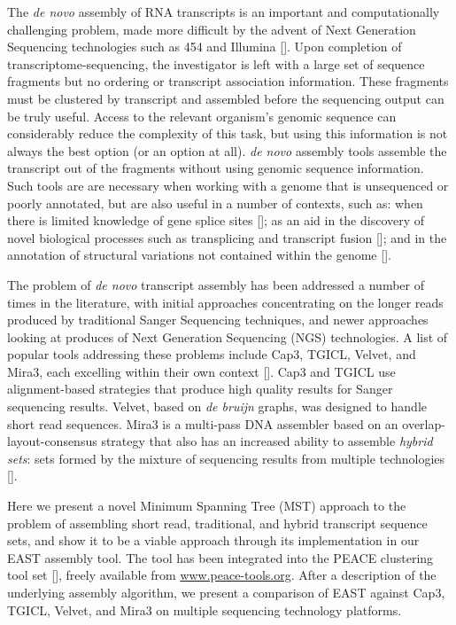 \documentclass{bioinfo}
\newcommand{\peace} {{\small PEACE}}
\newcommand{\capthree} {{\small Cap3}}
\newcommand{\tgicl} {{\small TGICL}}
\newcommand{\east} {{\small EAST}}
\newcommand{\velvet}{{\small Velvet}}
\newcommand{\mira}{{\small Mira3}}
\begin{document}
The {\it de novo} assembly of RNA transcripts is an important and
computationally challenging problem, made more difficult by the advent
of Next Generation Sequencing technologies such as 454 and Illumina
[\cite{Nagaraj07}].  Upon completion of transcriptome-sequencing, the
investigator is left with a large set of sequence fragments but no
ordering or transcript association information.  These fragments must
be clustered by transcript and assembled before the sequencing output
can be truly useful.  Access to the relevant organism's genomic
sequence can considerably reduce the complexity of this task, but
using this information is not always the best option (or an option at all).
{\it de novo} assembly tools assemble the transcript out of the
fragments without using genomic sequence information.  Such tools are
are necessary when working with a genome that is unsequenced
or poorly annotated, but are also useful in a number of contexts, such as:
when there is limited knowledge of gene splice sites
[\cite{Birol09,Robertson10}]; as an aid in the discovery of novel
biological processes such as transplicing and transcript fusion
[\cite{Mitelman07,Li08}]; and in the annotation of structural variations
not contained within the genome [\cite{Li10b}].


The problem of {\it de novo} transcript assembly has been addressed a
number of times in the literature, with initial approaches
concentrating on the longer reads produced by traditional Sanger
Sequencing techniques, and newer approaches looking at produces of
Next Generation Sequencing (NGS) technologies.  A list of popular
tools addressing these problems include \capthree, \tgicl, \velvet,
and \mira, each excelling within their own context
[\cite{Huang99,Pertea03,Chevreux04,Zerbino08}].  \capthree\/ and
\tgicl\/ use alignment-based strategies that produce high quality
results for Sanger sequencing results.  \velvet, based on {\it de
  bruijn} graphs, was designed to handle short read sequences.
\mira\/ is a multi-pass DNA assembler based on an
overlap-layout-consensus strategy that also has an increased ability
to assemble {\it hybrid sets}: sets formed by the mixture of
sequencing results from multiple technologies [\cite{MiraWeb}].


Here we present a novel Minimum Spanning Tree (MST) approach to the
problem of assembling short read, traditional, and hybrid transcript
sequence sets, and show it to be a viable approach through its
implementation in our \east\/ assembly tool.  The tool has been
integrated into the \peace\/ clustering tool set [\cite{Rao10}],
freely available from \url{www.peace-tools.org}.  After a description
of the underlying assembly algorithm, we present a comparison of
\east\/ against \capthree, \tgicl, \velvet, and \mira\/ on multiple
sequencing technology platforms.
\end{document}
